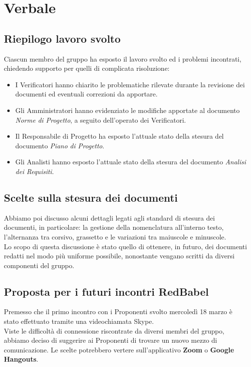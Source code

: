 \section{Verbale}
	
	\subsection{Riepilogo lavoro svolto}
		Ciascun membro del gruppo ha esposto il lavoro svolto ed i problemi incontrati, chiedendo supporto per quelli di complicata risoluzione:
		\begin{itemize}
			\item I Verificatori hanno chiarito le problematiche rilevate durante la revisione dei documenti ed eventuali correzioni da apportare.
			\item Gli Amministratori hanno evidenziato le modifiche apportate al documento \textit{Norme di Progetto}, a seguito dell'operato dei Verificatori.
			\item Il Responsabile di Progetto ha esposto l'attuale stato della stesura del documento \textit{Piano di Progetto}.
			\item Gli Analisti hanno esposto l'attuale stato della stesura del documento \textit{Analisi dei Requisiti}.
		\end{itemize}
		
		
	\subsection{Scelte sulla stesura dei documenti}
		Abbiamo poi discusso alcuni dettagli legati agli standard di stesura dei documenti, in particolare: la gestione della nomenclatura all'interno testo, l'alternanza tra corsivo, grassetto e le variazioni tra maiuscole e minuscole.\\
		Lo scopo di questa discussione è stato quello di ottenere, in futuro, dei documenti redatti nel modo più uniforme possibile, nonostante vengano scritti da diversi componenti del gruppo.
		
		
	\subsection{Proposta per i futuri incontri RedBabel}
		Premesso che il primo incontro con i Proponenti svolto mercoledì 18 marzo è stato effettuato tramite una videochiamata Skype.\\
		Viste le difficoltà di connessione riscontrate da diversi membri del gruppo, abbiamo deciso di suggerire ai Proponenti di trovare un nuovo mezzo di comunicazione. Le scelte potrebbero vertere sull'applicativo \textbf{Zoom} o \textbf{Google Hangouts}.


